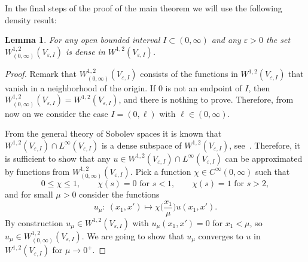 \documentclass[11pt,oneside,reqno,a4paper]{amsart}
\newcommand{\eps}{\varepsilon}
\newtheorem{lemma}[theorem]{Lemma}
\theoremstyle{definition}
\begin{document}
In the final steps of the proof of the main theorem we will use the following density result:
\begin{lemma}\label{lem5}%
	For any open bounded interval $I\subset(0,\infty)$ and any $\eps>0$ the set $W^{1,2}_{(0,\infty)}(V_{\eps,I})$ is dense in $W^{1,2}(V_{\eps,I})$.
\end{lemma}

\begin{proof}
Remark that $W^{1,2}_{(0,\infty)}(V_{\eps,I})$ consists of the functions in $W^{1,2}(V_{\eps,I})$ that vanish in a neighborhood of the origin. If $0$ is not an endpoint of $I$, then $W^{1,2}_{(0,\infty)}(V_{\eps,I})=W^{1,2}(V_{\eps,I})$, and there is nothing to prove. Therefore, from now on we consider the case $I=(0,\ell)$ with $\ell\in(0,\infty)$.

From the general theory of Sobolev spaces it is known that
$W^{1,2}(V_{\eps,I})\cap L^\infty(V_{\eps,I})$ is a dense subspace of $W^{1,2}(V_{\eps,I})$,
see~\cite[Theorem in Sec.~1.4.3]{mazya}. Therefore, it is sufficient to show that any $u\in W^{1,2}(V_{\eps,I})\cap L^\infty(V_{\eps,I})$ can be approximated by functions from $W^{1,2}_{(0,\infty)}(V_{\eps,I})$.
Pick a function $\chi\in C^\infty(0,\infty)$ such that
\[
0\le \chi\le 1,\qquad 
\chi(s)=0 \text{ for }s<1,\qquad \chi(s)=1 \text{ for }s>2,
\]
and for small $\mu>0$ consider the functions
\[
u_\mu:\ (x_1,x')\mapsto \chi\Big(\frac{x_1}{\mu}\Big)u(x_1,x').
\]
By construction $u_{\mu}\in W^{1,2}(V_{\eps,I})$ with $u_{\mu}(x_1,x')=0$ for $x_1<\mu$, so $u_{\mu}\in W^{1,2}_{(0,\infty)}(V_{\eps,I})$. We are going to show that $u_\mu$ converges to $u$ in
$W^{1,2}(V_{\eps,I})$ for $\mu\to 0^+$.


\end{proof}
\end{document}
